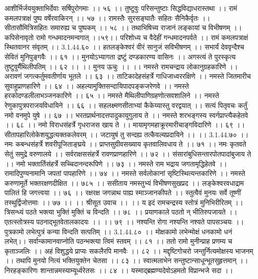 आशीर्भिर्जययुक्ताभिर्देवाः सर्षिपुरोगमाः ।। ५६ ।।
तुष्टुवुः परिसन्तुष्टाः सिद्धविद्याधरास्तथा ।।
रामं कमलपत्राक्षं पुष्प वर्षेरवाकिरन् ।। ५७ ।।
रामस्तैः सुरसङ्घातैः सहितः सैनिकैर्वृतः ।।
सीतासौमित्रिसहितः समारुह्य च पुष्पकम् ।। ५८ ।।
तथाभिषिच्य राजानं लङ्कायां च विभीषणम् ।।
कपिसेनावृतो रामो गन्धमादनमन्वगात् ।।५९।।
परिशोध्य च वैदेहीं गन्धमादनपर्वते ।।
रामं कमलपत्राक्षं स्थितवानर संवृतम् ।। 3.1.44.६० ।।
हतलङ्केश्वरं वीरं सानुजं सविभीषणम् ।।
सभार्यं देववृन्दैश्च सेवितं मुनिपुङ्गवैः ।। ६१ ।।
मुनयोऽभ्यागता द्रष्टुं दण्डकारण्य वासिनः ।।
अगस्त्यं ते पुरस्कृत्य तुष्टुवुर्मैथिलीपतिम् ।। ६२ ।।
।। मुनय ऊचुः ।। ।।
नमस्ते रामचन्द्राय लोकानुग्रहकारिणे ।।
अरावणं जगत्कर्तुमवतीर्णाय भूतले ।। ६३ ।।
ताटिकादेहसंहर्त्रे गाधिजाध्वररक्षिणे ।।
नमस्ते जितमारीच सुवाहुप्राणहारिणे ।। ६४ ।।
अहल्यामुक्तिसन्दायिपादपङ्कजरेणवे ।।
नमस्ते हरकोदण्डलीलाभञ्जनकारिणे ।। ६५ ।।
नमस्ते मैथिलीपाणिग्रहणोत्सवशालिने ।।
नमस्ते रेणुकापुत्रपराजयविधायिने ।। ६६ ।।
सहलक्ष्मणसीताभ्यां कैकेय्यास्तु वरद्वयात् ।।
सत्यं पितृवचः कर्तुं नमो वनमुपे युषे ।। ६७ ।।
भरतप्रार्थनादत्तपादुकायुगुलाय ते ।।
नमस्ते शरभङ्गस्य स्वर्गप्राप्त्यैकहेतवे ।। ६८ ।।
नमो विराधसंहर्त्रे गृधराजस खाय ते ।।
मायामृगमहाक्रूरमारीचाङ्गविदारिणे ।। ६९ ।।
सीतापहारिलोकेशयुद्धत्यक्तकलेवरम् ।।
जटायुषं तु सन्दह्य तत्कैवल्यप्रदायिने ।। ।। 3.1.44.७० ।।
नमः कबन्धसंहर्त्रे शवरीपूजिताङ्घ्रये ।।
प्राप्तसुग्रीवसख्याय कृतवालिवधाय ते ।। ७१ ।।
नमः कृतवते सेतुं समुद्रे वरुणालये ।।
सर्वराक्षससंहर्त्रे रावणप्राणहारिणे ।। ७२ ।।
संसारांबुधिसन्तारपोतपादांबुजाय ते ।।
नमो भक्तार्तिसंहर्त्रे सच्चिदानन्दरूपिणे ।। ७३ ।।
नमस्ते राम भद्राय जगतामृद्धिहेतवे ।।
रामादिपुण्यनामानि जपतां पापहारिणे ।। ७४ ।।
नमस्ते सर्वलोकानां सृष्टिस्थित्यन्तकारिणे ।।
नमस्ते करुणामूर्ते भक्तरक्षणदीक्षित ।। ७८५ ।।
ससीताय नमस्तुभ्यं विभीषणसुखप्रद ।।
लङ्केश्वरवधाद्राम पालितं हि जगत्त्वया ।। ७६ ।।
रक्षरक्ष जगन्नाथ पाह्य स्माञ्जानकीपते ।।
स्तुत्वैवं मुनयः सर्वे तूष्णीं तस्थुर्द्विजोत्तमाः ।। ७७ ।।
।। श्रीसूत उवाच ।। ।।
य इदं रामचन्द्रस्य स्तोत्रं मुनिभिरीरितम् ।।
त्रिसन्ध्यं पठते भक्त्या भुक्तिं मुक्तिं च विन्दति ।। ७८ ।।
प्रयाणकाले पठतो न् भीतिरुपजायते ।।
एतत्स्तोत्रस्य पठनाद्भूतवेतालकादयः ।। ।। ७९ ।।
नश्यन्ति रोगा नश्यन्ति नश्यते पापसञ्चयः ।।
पुत्रकामो लभेत्पुत्रं कन्या विन्दति सत्पतिम् ।। 3.1.44.८० ।।
मोक्षकामो लभेन्मोक्षं धनकामो धनं लभेत्।।
सर्वान्कामानवाप्नोति पठन्भक्त्या त्विमं स्तवम् ।। ८१ ।।
ततो रामो मुनीन्प्राह प्रणम्य च कृताञ्जलिः ।।
अहं विशुद्धये प्राप्यः सकलैरपि मानवैः ।। ८२ ।।
मद्दृष्टिगोचरो जन्तुर्नित्यमोक्षस्य भाजनम् ।।
तथापि मुनयो नित्यं भक्तियुक्तेन चेतसा ।। ८३ ।।
स्वात्मलाभेन सन्तुष्टान्साधून्भूतसुहृत्तमान् ।।
निरहङ्कारिणः शान्तान्नमस्याम्यूर्ध्वरेतसः ।। ८४ ।।
यस्माद्ब्रह्मण्यदेवोऽहमतो विप्रान्भजे सदा ।।
